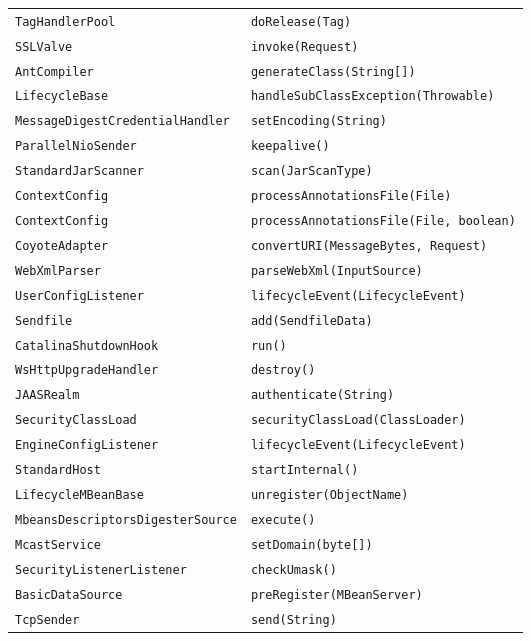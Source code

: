 \begin{center}
\begin{longtable}{ll}
\lstinline/TagHandlerPool/&{\lstinline/doRelease(Tag)/}\\
\lstinline/SSLValve/&{\lstinline/invoke(Request)/}\\
\lstinline/AntCompiler/&{\lstinline/generateClass(String[])/}\\
\lstinline/LifecycleBase/&{\lstinline/handleSubClassException(Throwable)/}\\
\lstinline/MessageDigestCredentialHandler/&{\lstinline/setEncoding(String)/}\\
\lstinline/ParallelNioSender/&{\lstinline/keepalive()/}\\
\lstinline/StandardJarScanner/&{\lstinline/scan(JarScanType)/}\\
\lstinline/ContextConfig/&{\lstinline/processAnnotationsFile(File)/}\\
\lstinline/ContextConfig/&{\lstinline/processAnnotationsFile(File, boolean)/}\\
\lstinline/CoyoteAdapter/&{\lstinline/convertURI(MessageBytes, Request)/}\\
\lstinline/WebXmlParser/&{\lstinline/parseWebXml(InputSource)/}\\
\lstinline/UserConfigListener/&{\lstinline/lifecycleEvent(LifecycleEvent)/}\\
\lstinline/Sendfile/&{\lstinline/add(SendfileData)/}\\
\lstinline/CatalinaShutdownHook/&{\lstinline/run()/}\\
\lstinline/WsHttpUpgradeHandler/&{\lstinline/destroy()/}\\
\lstinline/JAASRealm/&{\lstinline/authenticate(String)/}\\
\lstinline/SecurityClassLoad/&{\lstinline/securityClassLoad(ClassLoader)/}\\
\lstinline/EngineConfigListener/&{\lstinline/lifecycleEvent(LifecycleEvent)/}\\
\lstinline/StandardHost/&{\lstinline/startInternal()/}\\
\lstinline/LifecycleMBeanBase/&{\lstinline/unregister(ObjectName)/}\\
\lstinline/MbeansDescriptorsDigesterSource/&{\lstinline/execute()/}\\
\lstinline/McastService/&{\lstinline/setDomain(byte[])/}\\
\lstinline/SecurityListenerListener/&{\lstinline/checkUmask()/}\\
\lstinline/BasicDataSource/&{\lstinline/preRegister(MBeanServer)/}\\
\lstinline/TcpSender/&{\lstinline/send(String)/}\\

\end{longtable}
\end{center}
